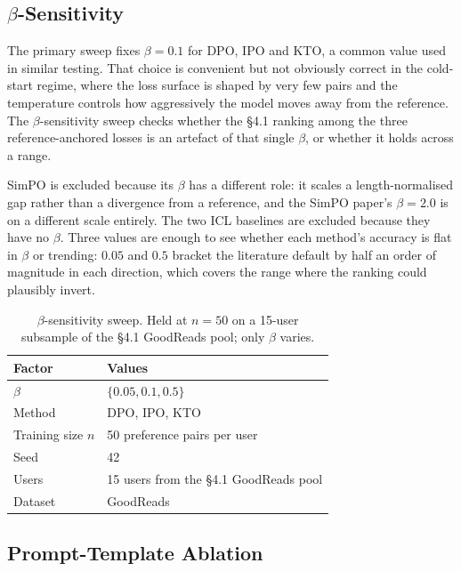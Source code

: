 \subsection{$\beta$-Sensitivity}
\label{sec:exp:beta}

The primary sweep fixes $\beta = 0.1$ for DPO, IPO and KTO, a common value used in similar testing. That choice is convenient but not obviously correct in the cold-start regime, where the loss surface is shaped by very few pairs and the temperature controls how aggressively the model moves away from the reference. The $\beta$-sensitivity sweep checks whether the \S4.1 ranking among the three reference-anchored losses is an artefact of that single $\beta$, or whether it holds across a range.

SimPO is excluded because its $\beta$ has a different role: it scales a length-normalised gap rather than a divergence from a reference, and the SimPO paper's $\beta = 2.0$ is on a different scale entirely. The two ICL baselines are excluded because they have no $\beta$. Three values are enough to see whether each method's accuracy is flat in $\beta$ or trending: $0.05$ and $0.5$ bracket the literature default by half an order of magnitude in each direction, which covers the range where the ranking could plausibly invert.

\begin{table}[h]
\centering
\caption{$\beta$-sensitivity sweep. Held at $n = 50$ on a 15-user subsample of the \S4.1 GoodReads pool; only $\beta$ varies.}
\label{tab:beta_grid}
\begin{tabular}{ll}
\toprule
\textbf{Factor} & \textbf{Values} \\
\midrule
$\beta$           & $\{0.05, 0.1, 0.5\}$ \\
Method            & DPO, IPO, KTO \\
Training size $n$ & 50 preference pairs per user \\
Seed              & 42 \\
Users             & 15 users from the \S4.1 GoodReads pool \\
Dataset           & GoodReads \\
\bottomrule
\end{tabular}
\end{table}


\subsection{Prompt-Template Ablation}
\label{sec:exp:prompt}

